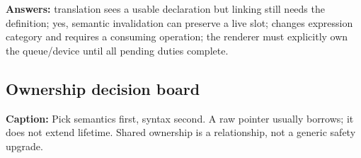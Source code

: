 \textbf{Answers:} translation sees a usable declaration but linking still needs the definition; yes, semantic invalidation can preserve a live slot;  changes expression category and requires a consuming operation; the renderer must explicitly own the queue/device until all pending duties complete.

\subsection{Ownership decision board}\label{appendix-960160274237-ownership-decision-board}

\hypertarget{appendix-960160274237-ownership-decision-board}{}


\textbf{Caption:} Pick semantics first, syntax second. A raw pointer usually borrows; it does not extend lifetime. Shared ownership is a relationship, not a generic safety upgrade.

